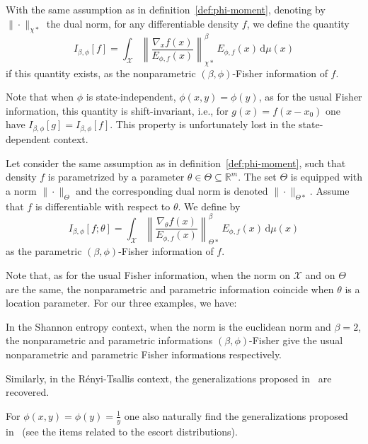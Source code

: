 \documentclass[entropy,article,submit,moreauthors,pdftex]{Definitions/mdpi}
\newcounter{GaussExample}%
\newcounter{qGaussExample}%
\newcounter{arcsineExample}%
\def\dmu{\mathrm{d}\mu}%
\def\Rset{\mathbb{R}}%
\def\X{\mathcal{X}}%
\begin{document}
\begin{Definition}
\label{def:np-phi-Fisher}
%
  With the  same assumption  as in definition~\ref{def:phi-moment},  denoting by
  $\| \cdot  \|_{\chi*}$ the dual norm,  for any differentiable density  $f$, we
  define the quantity
  \begin{equation}\label{eq:np-phi-Fisher}
  I_{\beta,\phi}[f] = \int_\X \left\| \frac{\nabla_x f(x)}{E_{\phi,f}(x)}
    \right\|_{\chi*}^\beta \, E_{\phi,f}(x) \, \dmu(x)
  \end{equation}
  if   this  quantity   exists,  as   the   nonparametric  $(\beta,\phi)$-Fisher
  information of $f$.
\end{Definition}
%
Note that  when $\phi$ is state-independent,  $\phi(x,y) = \phi(y)$, as  for the
usual Fisher  information, this quantity  is shift-invariant, i.e., for  $g(x) =
f(x-x_0)$  one have  $I_{\beta,\phi}[g] =  I_{\beta,\phi}[f]$. This  property is
unfortunately lost in the state-dependent context.

\begin{Definition}
\label{def:p-phi-Fisher}
%
  Let consider  the same assumption as  in definition~\ref{def:phi-moment}, such
  that density $f$  is parametrized by a parameter $\theta  \in \Theta \subseteq
  \Rset^m$.  The set $\Theta$ is equipped with a norm $\| \cdot \|_{\Theta}$ and
  the corresponding dual  norm is denoted $\| \cdot  \|_{\Theta*}$.  Assume that
  $f$ is differentiable with respect to $\theta$. We define by
  \begin{equation}\label{eq:p-phi-Fisher}
  I_{\beta,\phi}[f;\theta] = \int_\X \left\| \frac{\nabla_\theta
  f(x)}{E_{\phi,f}(x)} \right\|_{\Theta*}^\beta \, E_{\phi,f}(x) \, \dmu(x)
  \end{equation}
  as the parametric $(\beta,\phi)$-Fisher information of $f$.
\end{Definition}
%
Note that,  as for the usual  Fisher information, when  the norm on $\X$  and on
$\Theta$ are  the same,  the nonparametric  and parametric  information coincide
when $\theta$ is a location parameter. For our three examples, we have:
%
%
\begin{Example}
  In the Shannon entropy context, when the norm is the euclidean norm and $\beta
  = 2$, the nonparametric and parametric informations $(\beta,\phi)$-Fisher give
  the usual nonparametric and parametric Fisher informations respectively.
\end{Example}
%
\begin{Example}
  Similarly,  in  the  R\'enyi-Tsallis  context,  the  generalizations  proposed
  in~\cite{Ber12:06_1, Ber12:06_2, Ber13} are recovered.
\end{Example}
%
\begin{Example}
  For  $\phi(x,y)  =  \phi(y)  =   \frac{1}{y}$  one  also  naturally  find  the
  generalizations  proposed  in~\cite{Ber12:06_1,  Ber12:06_2, Ber13}  (see  the
  items related to the escort distributions).
\end{Example}
\end{document}
